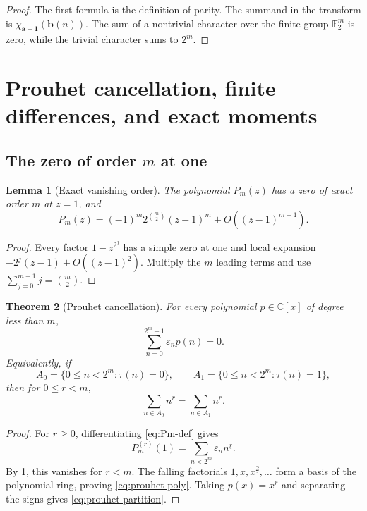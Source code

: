 \documentclass[11pt,oneside]{article}
\newtheorem{theorem}{Theorem}[section]
\newtheorem{lemma}[theorem]{Lemma}
\theoremstyle{definition}
\theoremstyle{remark}
\newcommand{\C}{\mathbb C}
\newcommand{\F}{\mathbb F}
\newcommand{\eps}{\varepsilon}
\newcommand{\fall}[2]{#1^{\underline{#2}}}
\newcommand{\1}{\mathbf 1}
\begin{document}
\begin{proof}
The first formula is the definition of parity.  The summand in the transform is
\(\chi_{\bm a+\bm1}(\bm b(n))\).  The sum of a nontrivial character over the finite group
\(\F_2^m\) is zero, while the trivial character sums to \(2^m\).
\end{proof}

\section{Prouhet cancellation, finite differences, and exact moments}
\label{sec:prouhet}

\subsection{The zero of order \(m\) at one}

\begin{lemma}[Exact vanishing order]
\label{lem:order-m}
The polynomial \(P_m(z)\) has a zero of exact order \(m\) at \(z=1\), and
\begin{equation}
 P_m(z)=(-1)^m2^{\binom m2}(z-1)^m+O((z-1)^{m+1}).
 \label{eq:Pm-local}
\end{equation}
\end{lemma}

\begin{proof}
Every factor \(1-z^{2^j}\) has a simple zero at one and local expansion
\(-2^j(z-1)+O((z-1)^2)\).  Multiply the \(m\) leading terms and use
\(\sum_{j=0}^{m-1}j=\binom m2\).
\end{proof}

\begin{theorem}[Prouhet cancellation]
\label{thm:prouhet}
For every polynomial \(p\in\C[x]\) of degree less than \(m\),
\begin{equation}
 \boxed{
 \sum_{n=0}^{2^m-1}\eps_np(n)=0.}
 \label{eq:prouhet-poly}
\end{equation}
Equivalently, if
\[
 A_0=\{0\le n<2^m:\tau(n)=0\},
 \qquad
 A_1=\{0\le n<2^m:\tau(n)=1\},
\]
then for \(0\le r<m\),
\begin{equation}
 \sum_{n\in A_0}n^r=\sum_{n\in A_1}n^r.
 \label{eq:prouhet-partition}
\end{equation}
\end{theorem}

\begin{proof}
For \(r\ge0\), differentiating \eqref{eq:Pm-def} gives
\[
 P_m^{(r)}(1)=\sum_{n<2^m}\eps_n\fall nr.
\]
By \cref{lem:order-m}, this vanishes for \(r<m\).  The falling factorials
\(1,x,\fall x2,\ldots\) form a basis of the polynomial ring, proving
\eqref{eq:prouhet-poly}.  Taking \(p(x)=x^r\) and separating the signs gives
\eqref{eq:prouhet-partition}.
\end{proof}
\end{document}
